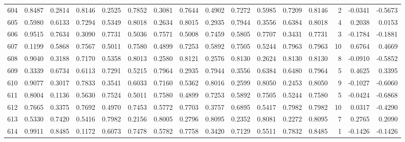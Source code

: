 \begin{tabular}{lrrrrrrrrrrrrrrr}
604 &      0.8487 &  0.2814 &  0.8146 &  0.2525 &  0.7852 &  0.3081 &  0.7644 &  0.4902 &  0.7272 &  0.5985 &   0.7209 &     0.8146 &      2 &                   -0.0341 &                    -0.5673 \\
605 &      0.5980 &  0.6133 &  0.7294 &  0.5349 &  0.8018 &  0.2634 &  0.8015 &  0.2935 &  0.7944 &  0.3556 &   0.6384 &     0.8018 &      4 &                    0.2038 &                     0.0153 \\
606 &      0.9515 &  0.7634 &  0.3090 &  0.7731 &  0.5036 &  0.7571 &  0.5008 &  0.7459 &  0.5805 &  0.7707 &   0.3431 &     0.7731 &      3 &                   -0.1784 &                    -0.1881 \\
607 &      0.1199 &  0.5868 &  0.7567 &  0.5011 &  0.7580 &  0.4899 &  0.7253 &  0.5892 &  0.7505 &  0.5244 &   0.7963 &     0.7963 &     10 &                    0.6764 &                     0.4669 \\
608 &      0.9040 &  0.3188 &  0.7170 &  0.5358 &  0.8013 &  0.2580 &  0.8121 &  0.2576 &  0.8130 &  0.2624 &   0.8130 &     0.8130 &      8 &                   -0.0910 &                    -0.5852 \\
609 &      0.3339 &  0.6734 &  0.6113 &  0.7291 &  0.5215 &  0.7964 &  0.2935 &  0.7944 &  0.3556 &  0.6384 &   0.6480 &     0.7964 &      5 &                    0.4625 &                     0.3395 \\
610 &      0.9077 &  0.3017 &  0.7833 &  0.3541 &  0.6033 &  0.7160 &  0.5362 &  0.8016 &  0.2599 &  0.8050 &   0.2453 &     0.8050 &      9 &                   -0.1027 &                    -0.6060 \\
611 &      0.8004 &  0.1136 &  0.5630 &  0.7524 &  0.5011 &  0.7580 &  0.4899 &  0.7253 &  0.5892 &  0.7505 &   0.5244 &     0.7580 &      5 &                   -0.0424 &                    -0.6868 \\
612 &      0.7665 &  0.3375 &  0.7692 &  0.4970 &  0.7453 &  0.5772 &  0.7703 &  0.3757 &  0.6895 &  0.5417 &   0.7982 &     0.7982 &     10 &                    0.0317 &                    -0.4290 \\
613 &      0.5330 &  0.7420 &  0.5416 &  0.7982 &  0.2156 &  0.8005 &  0.2796 &  0.8095 &  0.2352 &  0.8081 &   0.2272 &     0.8095 &      7 &                    0.2765 &                     0.2090 \\
614 &      0.9911 &  0.8485 &  0.1172 &  0.6073 &  0.7478 &  0.5782 &  0.7758 &  0.3420 &  0.7129 &  0.5511 &   0.7832 &     0.8485 &      1 &                   -0.1426 &                    -0.1426 \\

\end{tabular}

